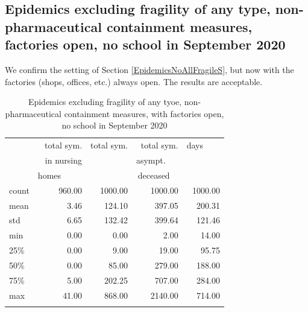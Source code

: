 \documentclass[graybox]{svmult}
\begin{document}
\subsection{Epidemics excluding fragility of any type, non-pharmaceutical containment measures, factories open, no school in September 2020}
\label{EpidemicsNoAllFragileFacsOnS}

We confirm the setting of Section \ref{EpidemicsNoAllFragileS}, but now with the factories (shops, offices, etc.) always open. The results are acceptable.

\begin{table}[t]
\center
\small
\begin{tabular}{lrrrr}
\hline\noalign{\smallskip}
{} & total sym.        &  total sym. & total sym.     & days~~~~ \\
{} & in nursing        &                  & asympt.~~~  & \\
{} & homes~~~~~  &                  & deceased~~ & \\
\noalign{\smallskip}\svhline\noalign{\smallskip}
count &     960.00 &             1000.00 &                 1000.00 & 1000.00 \\
mean  &       3.46 &              124.10 &                  397.05 &  200.31 \\
std   &       6.65 &              132.42 &                  399.64 &  121.46 \\
min   &       0.00 &                0.00 &                    2.00 &   14.00 \\
25\%   &       0.00 &                9.00 &                   19.00 &   95.75 \\
50\%   &       0.00 &               85.00 &                  279.00 &  188.00 \\
75\%   &       5.00 &              202.25 &                  707.00 &  284.00 \\
max   &      41.00 &              868.00 &                 2140.00 &  714.00 \\
\hline\noalign{\smallskip}
\end{tabular}

\label{EpidemicsNoAllFragileFacsOnT}
\caption{Epidemics excluding fragility of any tyoe, non-pharmaceutical containment measures, with factories open, no school in September 2020}
\end{table}
\end{document}
